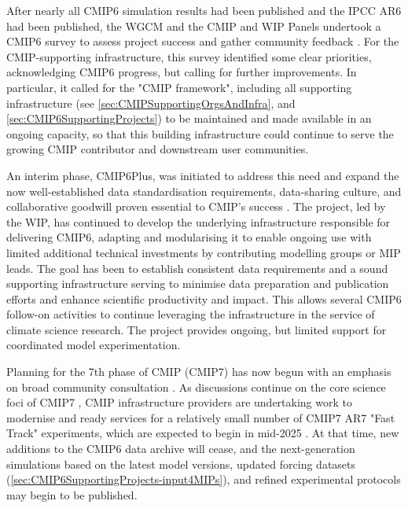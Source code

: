 \documentclass[manuscript]{copernicus}
\begin{document}
After nearly all CMIP6 simulation results had been published and the IPCC AR6 had been published, the WGCM and the CMIP and WIP Panels undertook a CMIP6 survey to assess project success and gather community feedback \citep{orourke_cmip6_2024}. For the CMIP-supporting infrastructure, this survey identified some clear priorities, acknowledging CMIP6 progress, but calling for further improvements. In particular, it called for the "CMIP framework", including all supporting infrastructure (see \autoref{sec:CMIPSupportingOrgsAndInfra}, and \autoref{sec:CMIP6SupportingProjects}) to be maintained and made available in an ongoing capacity, so that this building infrastructure could continue to serve the growing CMIP contributor and downstream user communities.

An interim phase, CMIP6Plus, was initiated to address this need and expand the now well-established data standardisation requirements, data-sharing culture, and collaborative goodwill proven essential to CMIP's success \citep{mizielinski_cmip6plus_2024}. The project, led by the WIP, has continued to develop the underlying infrastructure responsible for delivering CMIP6, adapting and modularising it to enable ongoing use with limited additional technical investments by contributing modelling groups or MIP leads. The goal has been to establish consistent data requirements and a sound supporting infrastructure serving to minimise data preparation and publication efforts and enhance scientific productivity and impact. This allows several CMIP6 follow-on activities to continue leveraging the infrastructure in the service of climate science research. The project provides ongoing, but limited support for coordinated model experimentation.

Planning for the 7th phase of CMIP (CMIP7) has now begun with an emphasis on broad community consultation \citep{orourke_cmip6_2024}. As discussions continue on the core science foci of CMIP7 \citep[e.g.,][]{dunne_climate_2023,dunne_evolving_2024}, CMIP infrastructure providers are undertaking work \citep[e.g.,][]{kershaw_esgf_2020} to modernise and ready services for a relatively small number of CMIP7 AR7 "Fast Track" experiments, which are expected to begin in mid-2025 \citep{dunne_evolving_2024}. At that time, new additions to the CMIP6 data archive will cease, and the next-generation simulations based on the latest model versions, updated forcing datasets (\autoref{sec:CMIP6SupportingProjects-input4MIPs}), and refined experimental protocols may begin to be published.
\end{document}
